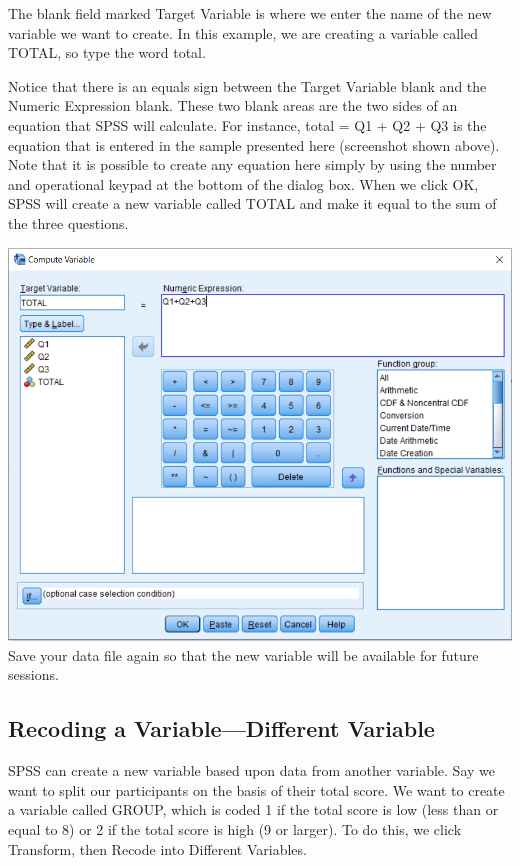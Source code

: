 \documentclass[
]{book}
\begin{document}
The blank field marked Target Variable is where we enter the name of the new variable we want to create. In this example, we are creating a variable called TOTAL, so type the word total.

Notice that there is an equals sign between the Target Variable blank and the Numeric Expression blank. These two blank areas are the two sides of an equation that SPSS will calculate. For instance, total = Q1 + Q2 + Q3 is the equation that is entered in the sample presented here (screenshot shown above). Note that it is possible to create any equation here simply by using the number and operational keypad at the bottom of the dialog box. When we click OK, SPSS will create a new variable called TOTAL and make it equal to the sum of the three questions.

\includegraphics{Transform3.png}
Save your data file again so that the new variable will be available for future sessions.

\hypertarget{recoding-a-variabledifferent-variable}{%
\subsection{Recoding a Variable---Different Variable}\label{recoding-a-variabledifferent-variable}}

SPSS can create a new variable based upon data from another variable. Say we want to split our participants on the basis of their total score. We want to create a variable called GROUP, which is coded 1 if the total score is low (less than or equal to 8) or 2 if the total score is high (9 or larger). To do this, we click Transform, then Recode into Different Variables.
\end{document}
